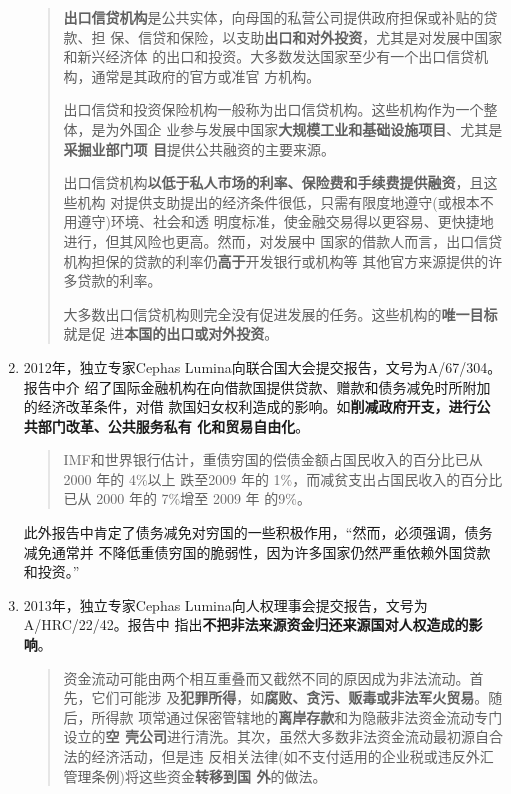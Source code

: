 \begin{enumerate}
\begin{quotation}
    \textbf{出口信贷机构}是公共实体，向母国的私营公司提供政府担保或补贴的贷款、担
    保、信贷和保险，以支助\textbf{出口和对外投资}，尤其是对发展中国家和新兴经济体
    的出口和投资。大多数发达国家至少有一个出口信贷机构，通常是其政府的官方或准官
    方机构。

    出口信贷和投资保险机构一般称为出口信贷机构。这些机构作为一个整体，是为外国企
    业参与发展中国家\textbf{大规模工业和基础设施项目}、尤其是\textbf{采掘业部门项
      目}提供公共融资的主要来源。

    出口信贷机构\textbf{以低于私人市场的利率、保险费和手续费提供融资}，且这些机构
    对提供支助提出的经济条件很低，只需有限度地遵守(或根本不用遵守)环境、社会和透
    明度标准，使金融交易得以更容易、更快捷地进行，但其风险也更高。然而，对发展中
    国家的借款人而言，出口信贷机构担保的贷款的利率仍\textbf{高于}开发银行或机构等
    其他官方来源提供的许多贷款的利率。

    大多数出口信贷机构则完全没有促进发展的任务。这些机构的\textbf{唯一目标}就是促
    进\textbf{本国的出口或对外投资}。
  \end{quotation}

\item 2012年，独立专家Cephas Lumina向联合国大会提交报告，文号为A/67/304。报告中介
  绍了国际金融机构在向借款国提供贷款、赠款和债务减免时所附加的经济改革条件，对借
  款国妇女权利造成的影响。如\textbf{削减政府开支，进行公共部门改革、公共服务私有
    化和贸易自由化}。
  \begin{quotation}
    IMF和世界银行估计，重债穷国的偿债金额占国民收入的百分比已从 2000 年的 4\%以上
    跌至2009 年的 1\%，而减贫支出占国民收入的百分比已从 2000 年的 7\%增至 2009 年
    的9\%。
  \end{quotation}

  此外报告中肯定了债务减免对穷国的一些积极作用，“然而，必须强调，债务减免通常并
  不降低重债穷国的脆弱性，因为许多国家仍然严重依赖外国贷款和投资。”

\item 2013年，独立专家Cephas Lumina向人权理事会提交报告，文号为A/HRC/22/42。报告中
  指出\textbf{不把非法来源资金归还来源国对人权造成的影响}。

  \begin{quotation}
    资金流动可能由两个相互重叠而又截然不同的原因成为非法流动。首先，它们可能涉
    及\textbf{犯罪所得}，如\textbf{腐败、贪污、贩毒或非法军火贸易}。随后，所得款
    项常通过保密管辖地的\textbf{离岸存款}和为隐蔽非法资金流动专门设立的\textbf{空
      壳公司}进行清洗。其次，虽然大多数非法资金流动最初源自合法的经济活动，但是违
    反相关法律(如不支付适用的企业税或违反外汇管理条例)将这些资金\textbf{转移到国
      外}的做法。


\end{quotation}
\end{enumerate}
